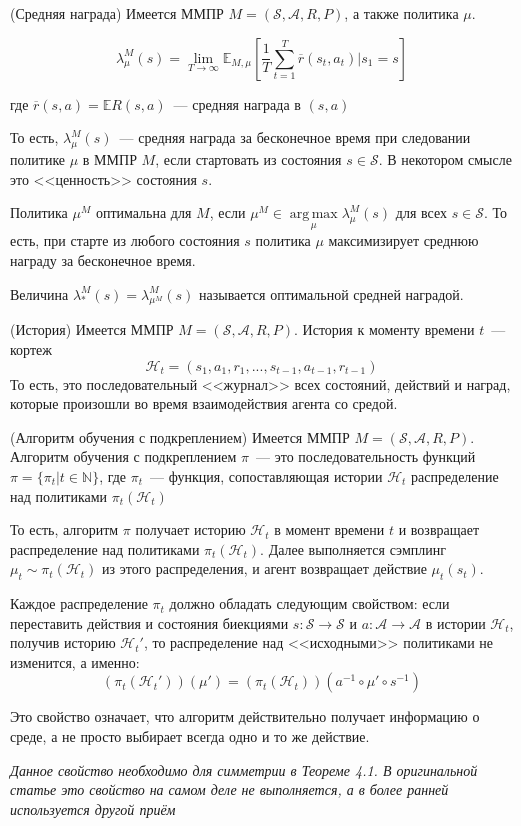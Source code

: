 \documentclass[a4paper]{article}
\DeclareMathOperator*{\argmax}{arg\,max}
\newcommand{\Hh}{\mathcal{H}}
\newcommand{\E}{\mathbb{E}}
\newcommand{\N}{\mathbb{N}}
\newcommand{\Ss}{\mathcal{S}}
\newcommand{\A}{\mathcal{A}}
\begin{document}
\begin{definition}{(Средняя награда)}
Имеется ММПР $M=(\Ss, \A,R,P)$, а также политика $\mu$.

$$\lambda_{\mu}^M(s)=\lim\limits_{T\to\infty}\E_{M,\mu}\left[\frac{1}{T}\sum\limits_{t=1}^T\overline{r}(s_t,a_t)\big|s_1=s\right]$$

где $\overline{r}(s,a)=\E R(s,a)$~--- средняя награда в $(s,a)$

То есть, $\lambda_{\mu}^M(s)$~--- средняя награда за бесконечное время при следовании политике $\mu$ в ММПР $M$, если стартовать из состояния $s\in\Ss$. В некотором смысле это <<ценность>> состояния $s$.

Политика $\mu^M$ оптимальна для $M$, если $\mu^M\in\argmax\limits_{\mu}\lambda^M_{\mu}(s)$ для всех $s\in\Ss$. То есть, при старте из любого состояния $s$ политика $\mu$ максимизирует среднюю награду за бесконечное время.

Величина $\lambda_*^M(s)=\lambda_{\mu^M}^M(s)$ называется оптимальной средней наградой.
\end{definition}

\begin{definition}{(История)}
Имеется ММПР $M=(\Ss,\A,R,P)$. История к моменту времени $t$~--- кортеж $$\Hh_t=(s_1,a_1,r_1,...,s_{t-1},a_{t-1},r_{t-1})$$
То есть, это последовательный <<журнал>> всех состояний, действий и наград, которые произошли во время взаимодействия агента со средой.
\end{definition}

\begin{definition}{(Алгоритм обучения с подкреплением)}
Имеется ММПР $M=(\Ss, \A,R,P)$. Алгоритм обучения с подкреплением $\pi$~--- это последовательность функций $\pi=\{\pi_t\big|t\in\N\}$, где $\pi_t$~--- функция, сопоставляющая истории $\Hh_t$ распределение над политиками $\pi_t(\Hh_t)$

То есть, алгоритм $\pi$ получает историю $\Hh_t$ в момент времени $t$ и возвращает распределение над политиками $\pi_t(\Hh_t)$. Далее выполняется сэмплинг $\mu_t\sim\pi_t(\Hh_t)$ из этого распределения, и агент возвращает действие $\mu_t(s_t)$.

Каждое распределение $\pi_t$ должно обладать следующим свойством: если переставить действия и состояния биекциями $s\colon \Ss\to\Ss$ и $a\colon \A\to\A$ в истории $\Hh_t$, получив историю $\Hh_t'$, то распределение над <<исходными>> политиками не изменится, а именно:
$$(\pi_t(\Hh_t'))(\mu')=(\pi_t(\Hh_t))(a^{-1}\circ\mu'\circ s^{-1})$$

Это свойство означает, что алгоритм действительно получает информацию о среде, а не просто выбирает всегда одно и то же действие.

{\em Данное свойство необходимо для симметрии в Теореме 4.1. В оригинальной статье \cite{lower_bounds} это свойство на самом деле не выполняется, а в более ранней \cite{bubeck} используется другой приём}
\end{definition}
\end{document}
